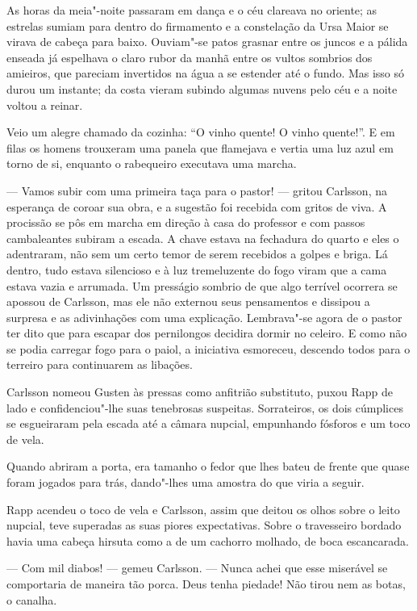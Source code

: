As horas da meia"-noite
passaram em dança e o céu clareava no oriente; as estrelas sumiam para dentro
do firmamento e a constelação da Ursa Maior se virava de cabeça para baixo.
Ouviam"-se patos grasnar entre os juncos e a pálida enseada já espelhava o
claro rubor da manhã entre os vultos sombrios dos amieiros, que pareciam
invertidos na água a se estender até o fundo. Mas isso só durou um
instante; da costa vieram subindo algumas nuvens pelo céu e a noite voltou a reinar. 

Veio um alegre chamado da cozinha: ``O vinho quente! O vinho quente!''. E em
filas os homens trouxeram uma panela que flamejava e vertia uma luz azul em
torno de si, enquanto o rabequeiro executava uma marcha.

--- Vamos subir com uma primeira taça para o pastor! --- gritou Carlsson, na esperança
de coroar sua obra, e a sugestão foi recebida com gritos de viva. A procissão se
pôs em marcha em direção à casa do professor e com passos cambaleantes subiram a
escada. A chave estava na fechadura do quarto e eles o adentraram, não sem
um certo temor de serem recebidos a golpes e briga. Lá dentro, tudo estava silencioso
e à luz tremeluzente do fogo viram que a cama estava vazia e arrumada. Um
presságio sombrio de que algo terrível ocorrera se apossou de Carlsson, mas ele não externou
seus pensamentos e dissipou a surpresa e as adivinhações com uma explicação.
Lembrava"-se agora de o pastor ter dito que para escapar dos pernilongos
decidira dormir no celeiro. E como não se podia carregar fogo para o paiol, a
iniciativa esmoreceu, descendo todos para o terreiro para continuarem as libações.

Carlsson nomeou Gusten às pressas como anfitrião substituto, puxou Rapp de lado
e confidenciou"-lhe suas tenebrosas suspeitas. Sorrateiros, os dois cúmplices
se esgueiraram pela escada até a câmara nupcial, empunhando fósforos e um toco
de vela.

Quando abriram a porta, era tamanho o fedor que lhes bateu de frente que quase 
foram jogados para trás, dando"-lhes uma amostra do que viria a seguir.

Rapp acendeu o toco de vela e Carlsson, assim que deitou os olhos sobre o leito nupcial, 
teve superadas as suas piores expectativas. Sobre o travesseiro bordado havia uma cabeça
hirsuta como a de um cachorro molhado, de boca escancarada.

--- Com mil diabos! --- gemeu Carlsson. --- Nunca achei que esse miserável se
comportaria de maneira tão porca. Deus tenha piedade! Não tirou nem as botas, o canalha.

